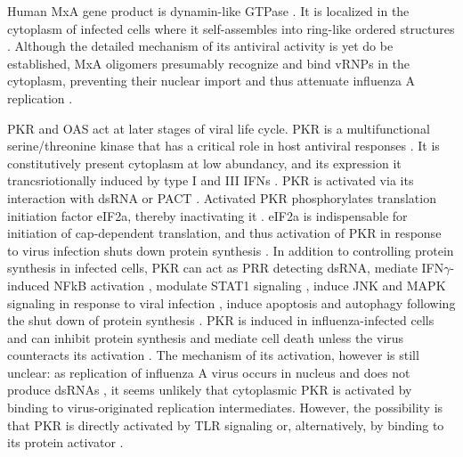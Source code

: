 		Human \gls{MxA} gene product is dynamin-like \gls{GTPase} \parencite{Nakayama1992}. It is localized in the cytoplasm of infected cells where it self-assembles into ring-like ordered structures \parencite{Gao2010}. Although the detailed mechanism of its antiviral activity is yet do be established, \gls{MxA} oligomers presumably recognize and bind \gls{vRNP}s in the cytoplasm, preventing their nuclear import and thus attenuate influenza A replication \parencite{Haller2010}.
		
		\gls{PKR} and \gls{OAS} act at later stages of viral life cycle. \gls{PKR} is a multifunctional serine/threonine kinase that has a critical role in host antiviral responses \parencite{Garcia2006a}. It is constitutively present cytoplasm at low abundancy, and its expression it trancsriotionally induced by type I and III \gls{IFN}s \parencite{Meurs1990}. \gls{PKR} is activated via its interaction with dsRNA or \gls{PACT} \parencite{Li2006a}. Activated \gls{PKR} phosphorylates translation initiation factor \gls{eIF2a}, thereby inactivating it \parencite{Levin1978}. \gls{eIF2a} is indispensable for initiation of cap-dependent translation, and thus activation of \gls{PKR} in response to virus infection shuts down protein synthesis \parencite{Kimball1999}. In addition to controlling protein synthesis in infected cells, \gls{PKR} can act as \gls{PRR} detecting dsRNA, mediate \gls{IFN}$\gamma$-induced \gls{NFkB} activation \parencite{Deb2001}, modulate \gls{STAT}1 signaling \parencite{Wong1997}, induce \gls{JNK} and \gls{MAPK} signaling in response to viral infection \parencite{Chu1999}, induce apoptosis and autophagy following the shut down of protein synthesis \parencite{Gil2000, Talloczy2002}. \gls{PKR} is induced in influenza-infected cells and can inhibit protein synthesis and mediate cell death unless the virus counteracts its activation \parencite{Takizawa1996, Hatada1999}.  The mechanism of its activation, however is still unclear: as replication of influenza A virus occurs in nucleus and does not produce dsRNAs \parencite{Wisskirchen2011}, it seems unlikely that cytoplasmic \gls{PKR} is activated by binding to virus-originated replication intermediates. However, the possibility is that \gls{PKR} is directly activated by \gls{TLR} signaling \parencite{Jiang2003} or, alternatively, by binding to its protein activator \parencite{Garcia2006a}.
		
